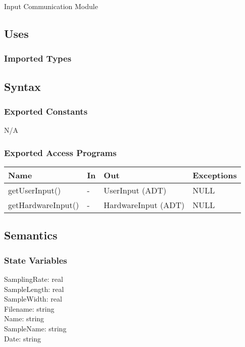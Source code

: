 \documentclass[12pt, titlepage]{article}
\begin{document}
Input Communication Module

\subsection{Uses}

\subsubsection{Imported Types}


\subsection{Syntax}

\subsubsection{Exported Constants}

N/A
\subsubsection{Exported Access Programs}

\begin{center}
\begin{tabular}{p{5cm} p{2cm} p{5cm} p{3cm}}
\hline
\textbf{Name} & \textbf{In} & \textbf{Out} & \textbf{Exceptions} \\
\hline
getUserInput() & - & UserInput (ADT) & NULL\\ 
getHardwareInput() & - & HardwareInput (ADT) & NULL\\ 
\hline
\end{tabular}
\end{center}

\subsection{Semantics}

\subsubsection{State Variables}
SamplingRate: real \\
SampleLength: real \\
SampleWidth: real \\
Filename: string \\ 
Name: string \\ 
SampleName: string \\ 
Date: string \\
\end{document}
